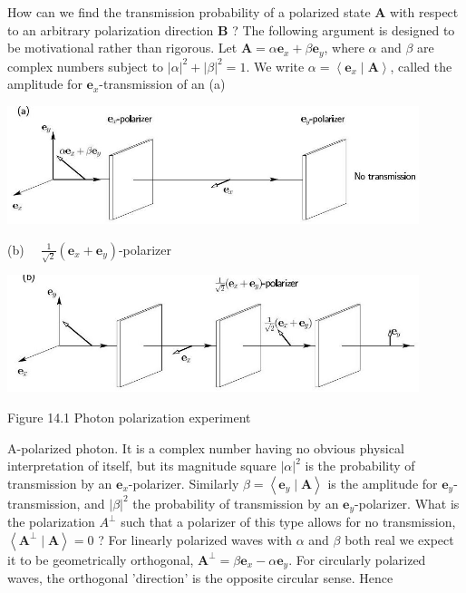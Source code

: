 \documentclass[hyperref,UTF8]{ctexbook}
\begin{document}
How can we find the transmission probability of a polarized state $\mathbf{A}$ with respect to an arbitrary polarization direction $\mathbf{B}$ ? The following argument is designed to be motivational rather than rigorous. Let $\mathbf{A}=\alpha \mathbf{e}_{x}+\beta \mathbf{e}_{y}$, where $\alpha$ and $\beta$ are complex numbers subject to $|\alpha|^{2}+|\beta|^{2}=1$. We write $\alpha=\left\langle\mathbf{e}_{x} \mid \mathbf{A}\right\rangle$, called the amplitude for $\mathbf{e}_{x}$-transmission of an
(a)

\begin{center}
\includegraphics[width=12cm]{2023_12_20_5d48e1c38160b1e32b28g-03}
\end{center}

(b) $\quad \frac{1}{\sqrt{2}}\left(\mathbf{e}_{x}+\mathbf{e}_{y}\right)$-polarizer

\begin{center}
\includegraphics[width=12cm]{2023_12_20_5d48e1c38160b1e32b28g-03(1)}
\end{center}

Figure 14.1 Photon polarization experiment

A-polarized photon. It is a complex number having no obvious physical interpretation of itself, but its magnitude square $|\alpha|^{2}$ is the probability of transmission by an $\mathbf{e}_{x}$-polarizer. Similarly $\beta=\left\langle\mathbf{e}_{y} \mid \mathbf{A}\right\rangle$ is the amplitude for $\mathbf{e}_{y}$-transmission, and $|\beta|^{2}$ the probability of transmission by an $\mathbf{e}_{y}$-polarizer. What is the polarization $A^{\perp}$ such that a polarizer of this type allows for no transmission, $\left\langle\mathbf{A}^{\perp} \mid \mathbf{A}\right\rangle=0$ ? For linearly polarized waves with $\alpha$ and $\beta$ both real we expect it to be geometrically orthogonal, $\mathbf{A}^{\perp}=\beta \mathbf{e}_{x}-\alpha \mathbf{e}_{y}$. For circularly polarized waves, the orthogonal 'direction' is the opposite circular sense. Hence
\end{document}
